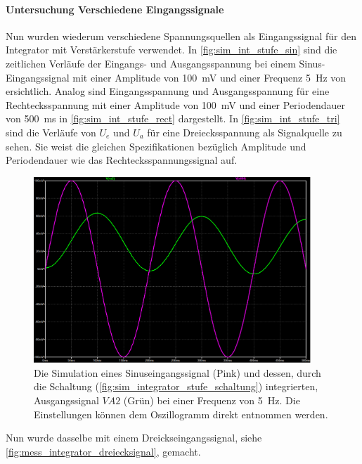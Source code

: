 \documentclass[12pt,english,ngerman]{scrartcl}
\begin{document}
\paragraph{Untersuchung Verschiedene Eingangssignale}
Nun wurden wiederum verschiedene Spannungsquellen als Eingangssignal für den
Integrator mit Verstärkerstufe verwendet. In \autoref{fig:sim_int_stufe_sin}
sind die zeitlichen Verläufe der Eingangs- und Ausgangsspannung bei einem
Sinus-Eingangssignal mit einer Amplitude von \SI{100}{\milli\volt} und einer
Frequenz \SI{5}{\hertz} von ersichtlich. Analog sind Eingangsspannung und
Ausgangsspannung für eine Rechtecksspannung mit einer Amplitude von
\SI{100}{\milli\volt} und einer Periodendauer von \SI{500}{\milli\second} in
\autoref{fig:sim_int_stufe_rect} dargestellt. In
\autoref{fig:sim_int_stufe_tri} sind die Verläufe von $U_e$ und $U_a$ für eine
Dreiecksspannung als Signalquelle zu sehen. Sie weist die gleichen Spezifikationen
bezüglich Amplitude und Periodendauer wie das Rechtecksspannungssignal auf.

\begin{figure}[H]
  \centering
    \includegraphics[width=\linewidth, height=7cm]{./figures/integrator/sim/mit_stufe/sin100mv_5hz.png}
  \caption{Die Simulation eines Sinuseingangssignal (Pink) und dessen, durch
  die Schaltung (\autoref{fig:sim_integrator_stufe_schaltung}) integrierten,
  Ausgangssignal $VA2$ (Grün) bei einer Frequenz von \SI{5}{\hertz}. Die
  Einstellungen können dem Oszillogramm direkt entnommen werden.}
  \label{fig:sim_int_stufe_sin}
\end{figure}

Nun wurde dasselbe mit einem Dreickseingangssignal, siehe
\autoref{fig:mess_integrator_dreiecksignal}, gemacht.
\end{document}
